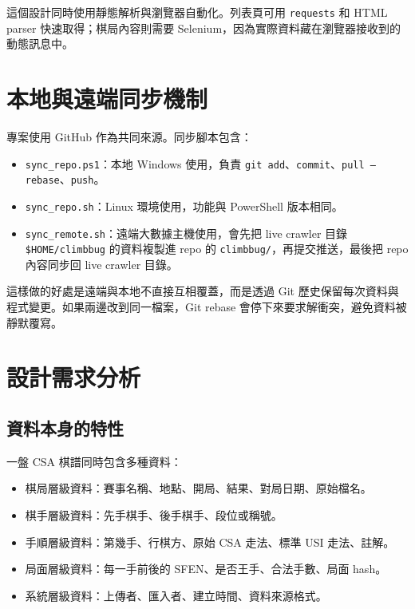\documentclass[12pt,a4paper,fontset=none]{ctexart}
\begin{document}
這個設計同時使用靜態解析與瀏覽器自動化。列表頁可用 \texttt{requests} 和 HTML parser 快速取得；棋局內容則需要 Selenium，因為實際資料藏在瀏覽器接收到的動態訊息中。

\section{本地與遠端同步機制}

專案使用 GitHub 作為共同來源。同步腳本包含：

\begin{itemize}
  \item \texttt{sync\_repo.ps1}：本地 Windows 使用，負責 \texttt{git add}、\texttt{commit}、\texttt{pull --rebase}、\texttt{push}。
  \item \texttt{sync\_repo.sh}：Linux 環境使用，功能與 PowerShell 版本相同。
  \item \texttt{sync\_remote.sh}：遠端大數據主機使用，會先把 live crawler 目錄 \texttt{\$HOME/climbbug} 的資料複製進 repo 的 \texttt{climbbug/}，再提交推送，最後把 repo 內容同步回 live crawler 目錄。
\end{itemize}

這樣做的好處是遠端與本地不直接互相覆蓋，而是透過 Git 歷史保留每次資料與程式變更。如果兩邊改到同一檔案，Git rebase 會停下來要求解衝突，避免資料被靜默覆寫。

\section{設計需求分析}

\subsection{資料本身的特性}

一盤 CSA 棋譜同時包含多種資料：

\begin{itemize}
  \item 棋局層級資料：賽事名稱、地點、開局、結果、對局日期、原始檔名。
  \item 棋手層級資料：先手棋手、後手棋手、段位或稱號。
  \item 手順層級資料：第幾手、行棋方、原始 CSA 走法、標準 USI 走法、註解。
  \item 局面層級資料：每一手前後的 SFEN、是否王手、合法手數、局面 hash。
  \item 系統層級資料：上傳者、匯入者、建立時間、資料來源格式。
\end{itemize}
\end{document}
